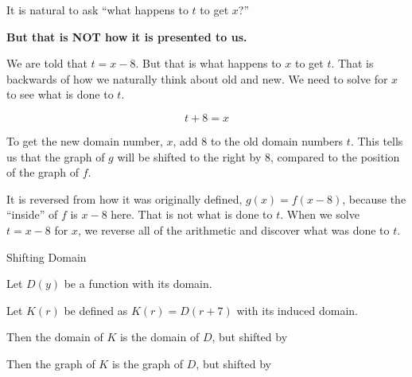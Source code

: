 \documentclass{ximera}
\begin{document}
It is natural to ask ``what happens to $t$ to get $x$?''  



\begin{center}
\textbf{\textcolor{red!80!black}{But that is NOT how it is presented to us.}}
\end{center}






We are told that $t=x-8$.  But that is what happens to $x$ to get $t$.  That is backwards of how we naturally think about old and new.  We need to solve for $x$ to see what is done to $t$.

\[ t+8=x \]

To get the new domain number, $x$, add $8$ to the old domain numbers $t$.  This tells us that the graph of $g$ will be shifted to the right by $8$, compared to the position of the graph of $f$.


It is reversed from how it was originally defined, $g(x) = f(x-8)$, because the ``inside'' of $f$ is $x-8$ here.  That is not what is done to $t$.  When we solve $t=x-8$ for $x$, we reverse all of the arithmetic and discover what was done to $t$.




\begin{example} Shifting Domain


Let $D(y)$ be a function with its domain.

Let $K(r)$ be defined as $K(r) = D(r+7)$ with its induced domain.


Then the domain of $K$ is the domain of $D$, but shifted  by 


Then the graph of $K$ is the graph of $D$, but shifted  by 




\end{example}
\end{document}
